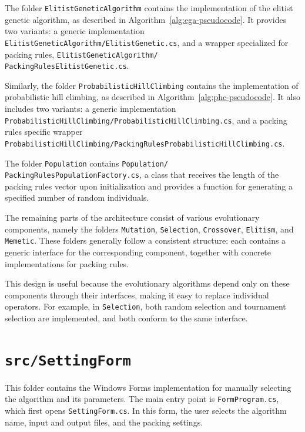 The folder \texttt{ElitistGeneticAlgorithm} contains the implementation of the elitist genetic algorithm, as described in Algorithm~\ref{alg:ega-pseudocode}. 
It provides two variants: a generic implementation \texttt{ElitistGeneticAlgorithm/\allowbreak ElitistGenetic.cs}, 
and a wrapper specialized for packing rules, \texttt{ElitistGeneticAlgorithm/\\PackingRulesElitistGenetic.cs}.

Similarly, the folder \texttt{ProbabilisticHillClimbing} contains the implementation of probabilistic hill climbing, as described in Algorithm~\ref{alg:phc-pseudocode}. 
It also includes two variants: a generic implementation \texttt{ProbabilisticHillClimbing/\allowbreak ProbabilisticHillClimbing.cs}, 
and a packing rules specific wrapper\\\texttt{ProbabilisticHillClimbing/PackingRulesProbabilisticHillClimbing.cs}.

The folder \texttt{Population} contains \texttt{Population/\\PackingRulesPopulationFactory.cs}, 
a class that receives the length of the packing rules vector upon initialization and provides a function for generating a specified number of random individuals.

The remaining parts of the architecture consist of various evolutionary components, namely the folders 
\texttt{Mutation}, \texttt{Selection},
\texttt{Crossover}, \texttt{Elitism}, and 
\texttt{Memetic}. These folders generally follow a consistent structure: each contains a generic interface for the corresponding component, 
together with concrete implementations for packing rules.

This design is useful because the evolutionary algorithms depend only on these components through their interfaces, making it easy to replace individual operators. 
For example, in \texttt{Selection}, both random selection and tournament selection are implemented, and both conform to the same interface.

\section{\texttt{src/SettingForm}}

This folder contains the Windows Forms implementation for manually selecting the algorithm and its parameters. 
The main entry point is \texttt{FormProgram.cs}, which first opens \texttt{SettingForm.cs}. 
In this form, the user selects the algorithm name, input and output files, and the packing settings.

